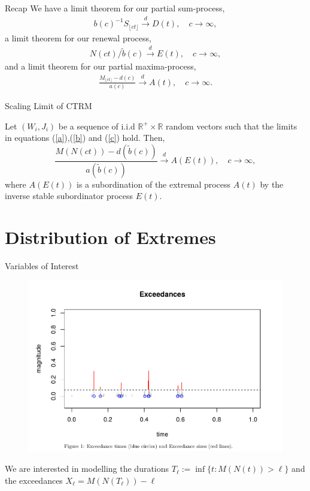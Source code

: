 \documentclass{beamer}
\newcommand{\cd}{\overset{d}{\longrightarrow}}
\newcommand{\Floor}[1]{{\lfloor {#1} \rfloor}}
\begin{document}
\begin{frame}{Recap}
We have a limit theorem for our partial sum-process,
\begin{align}\label{a}
	b(c)^{-1}S_\Floor{ct} \cd D(t), \quad c \to \infty,
\end{align}
a limit theorem for our renewal process,
\begin{align}\label{b}
	N(ct) / \tilde b(c) \cd E(t), \quad c \to \infty,
\end{align}
and a limit theorem for our partial maxima-process,
\begin{align}\label{c}
	\frac{M_\Floor{ct}-d(c)}{a(c)} \cd A(t), \quad c \to \infty.
\end{align}
\end{frame}

\begin{frame}{Scaling Limit of CTRM}
\begin{theorem}
Let $(W_i,J_i)$ be a sequence of i.i.d $\mathbb{R}^+\times\mathbb{R}$ random vectors such that the limits in equations (\ref{a}),(\ref{b}) and (\ref{c}) hold. Then,
        \[
            \frac{M(N(ct))-d(\tilde{b}(c))}{a(\tilde{b}(c))} \cd A(E(t)), \quad c\to\infty,
        \]
where $A(E(t))$ is a subordination of the extremal process $A(t)$ by the inverse stable subordinator process $E(t)$.\\
\end{theorem}
\end{frame}

\section{Distribution of Extremes}

\begin{frame}{Variables of Interest}

    \begin{figure}
        \centering
        \vspace{-0.5cm}
        \hspace{-0cm}
        \includegraphics[scale=0.3]{Exceedances.png}
    \end{figure}
    We are interested in modelling the durations $T_\ell := \inf\{t: M(N(t)) > \ell\}$ and the exceedances $X_\ell=M(N(T_\ell))-\ell$    
\end{frame}
\end{document}
